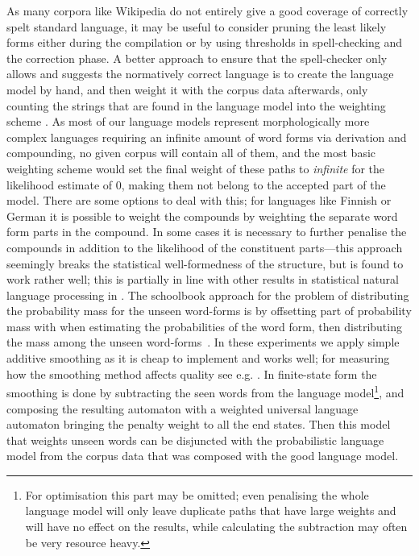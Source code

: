 \documentclass[a4paper,12pt]{article}
\begin{document}
As many corpora like Wikipedia do not entirely give a good coverage of
correctly spelt standard language, it may be useful to consider pruning the
least likely forms either during the compilation or by using thresholds in
spell-checking and the correction phase. A better approach to ensure that the
spell-checker only allows and suggests the normatively correct language is to create
the language model by hand, and then weight it with the corpus data afterwards,
only counting the strings that are found in the language model into the
weighting scheme \cite[]{pirinen/2009/nodalida}. As most of our language
models represent morphologically more complex languages requiring an infinite
amount of word forms via derivation and compounding, no given corpus will
contain all of them, and the most basic weighting scheme would set the final
weight of these paths to \emph{infinite} for the likelihood estimate of 0,
making them not belong to the accepted part of the model. There are some
options to deal with this; for languages like Finnish or German
\cite[]{schiller2006german} it is possible to weight the compounds by weighting
the separate word form parts in the compound. In some cases it is necessary to
further penalise the compounds in addition to the likelihood of the constituent
parts---this approach seemingly breaks the statistical well-formedness of the
structure, but is found to work rather well; this is partially in line with
other results in statistical natural language processing in
\cite{brants2007large}. The schoolbook approach for the problem of distributing
the probability mass for the unseen word-forms is by offsetting part of
probability mass with when estimating the probabilities of the word form, then
distributing the mass among the unseen word-forms~\cite[for a good introduction
to smoothing models we refer to][]{jurafsky2000speech}. In these experiments we
apply simple additive smoothing as it is cheap to implement and works well; for measuring how the smoothing method affects quality see e.g.
\cite{chen1999empirical}. In finite-state form the smoothing is done by
subtracting the seen words from the language model\footnote{For optimisation
    this part may be omitted; even penalising the whole language model will
    only leave duplicate paths that have large weights and will have no effect
on the results, while calculating the subtraction may often be very resource
heavy.}, and composing the resulting automaton with a weighted universal
language automaton bringing the penalty weight to all the end states. Then
this model that weights unseen words can be disjuncted with the probabilistic
language model from the corpus data that was composed with the good language
model.
\end{document}
